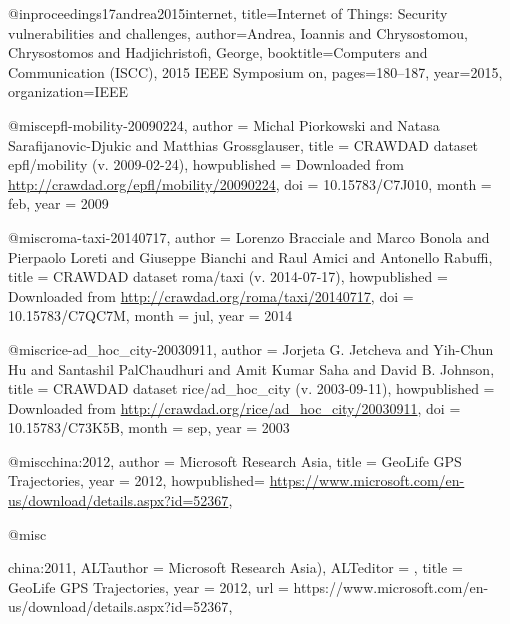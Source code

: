 {{{{{{@inproceedings{17andrea2015internet,
  title={Internet of Things: Security vulnerabilities and challenges},
  author={Andrea, Ioannis and Chrysostomou, Chrysostomos and Hadjichristofi, George},
  booktitle={Computers and Communication (ISCC), 2015 IEEE Symposium on},
  pages={180--187},
  year={2015},
  organization={IEEE}
}
































@misc{epfl-mobility-20090224,
    author = {Michal Piorkowski and Natasa Sarafijanovic-Djukic and Matthias Grossglauser},
    title = {{CRAWDAD} dataset epfl/mobility (v. 2009-02-24)},
    howpublished = {Downloaded from \url{http://crawdad.org/epfl/mobility/20090224}},
    doi = {10.15783/C7J010},
    month = feb,
    year = 2009
}

@misc{roma-taxi-20140717,
    author = {Lorenzo Bracciale and Marco Bonola and Pierpaolo Loreti and Giuseppe Bianchi and Raul Amici and Antonello Rabuffi},
    title = {{CRAWDAD} dataset roma/taxi (v. 2014-07-17)},
    howpublished = {Downloaded from \url{http://crawdad.org/roma/taxi/20140717}},
    doi = {10.15783/C7QC7M},
    month = jul,
    year = 2014
}

@misc{rice-ad_hoc_city-20030911,
    author = {Jorjeta G. Jetcheva and Yih-Chun Hu and Santashil PalChaudhuri and Amit Kumar Saha and David B. Johnson},
    title = {{CRAWDAD} dataset rice/ad\_hoc\_city (v. 2003-09-11)},
    howpublished = {Downloaded from \url{http://crawdad.org/rice/ad_hoc_city/20030911}},
    doi = {10.15783/C73K5B},
    month = sep,
    year = 2003
}

@misc{china:2012,
author = {Microsoft Research Asia},
title = {GeoLife GPS Trajectories},
year = {2012},
howpublished= {\url{https://www.microsoft.com/en-us/download/details.aspx?id=52367}},
}


@misc{china:2011,
ALTauthor = {Microsoft Research Asia)},
ALTeditor = {},
title = {GeoLife GPS Trajectories,
year = {2012},
url = {https://www.microsoft.com/en-us/download/details.aspx?id=52367},
}


}}}}}}}
